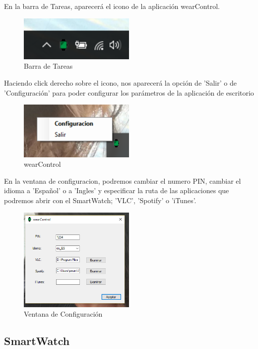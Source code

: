 \documentclass{documentation}
\begin{document}
En la barra de Tareas, aparecerá el icono de la aplicación wearControl.
\begin{figure}[!ht]
	\centering
	\includegraphics[width=0.5\textwidth]{figures/pc/1.png}
	\caption{Barra de Tareas}
\end{figure}
\newpage
Haciendo click derecho sobre el icono, nos aparecerá la opción de 'Salir' o de 'Configuración' para poder configurar los parámetros de la aplicación de escritorio

\begin{figure}[!ht]
	\centering
	\includegraphics[width=0.5\textwidth]{figures/pc/2.png}
	\caption{wearControl}
\end{figure}

En la ventana de configuracion, podremos cambiar el numero PIN, cambiar el idioma a 'Español' o a 'Ingles' y especificar la ruta de las aplicaciones que podremos abrir con el SmartWatch; 'VLC', 'Spotify' o 'iTunes'.

\begin{figure}[!ht]
	\centering
	\includegraphics[width=0.5\textwidth]{figures/pc/3.png}
	\caption{Ventana de Configuración}
\end{figure}

\newpage
\subsection{SmartWatch}
\end{document}
